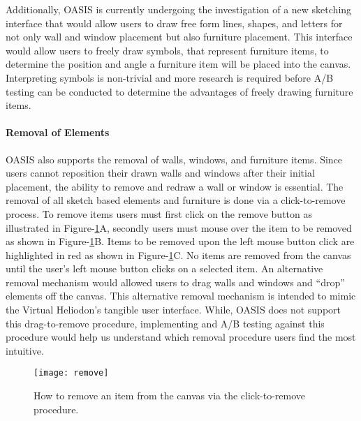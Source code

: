 Additionally, OASIS is currently undergoing the investigation of a new sketching interface that would allow users to draw free form lines, shapes, and letters for not only wall and window placement but also furniture placement.
This interface would allow users to freely draw symbols, that represent furniture items, to determine the position and angle a furniture item will be placed into the canvas.
Interpreting symbols is non-trivial and more research is required before A/B testing can be conducted to determine the advantages of freely drawing furniture items.


\paragraph{Removal of Elements}
OASIS also supports the removal of walls, windows, and furniture items.
Since users cannot reposition their drawn walls and windows after their initial placement, the ability to remove and redraw a wall or window is essential.
The removal of all sketch based elements and furniture is done via a click-to-remove process.
To remove items users must first click on the remove button as illustrated in Figure-\ref{fig:remove}A, secondly users must mouse over the item to be removed as shown in Figure-\ref{fig:remove}B.
Items to be removed upon the left mouse button click are highlighted in red as shown in Figure-\ref{fig:remove}C.
No items are removed from the canvas until the user's left mouse button clicks on a selected item.
An alternative removal mechanism would allowed users to drag walls and windows and ``drop'' elements off the canvas. 
This alternative removal mechanism is intended to mimic the Virtual Heliodon's tangible user interface.
While, OASIS does not support this drag-to-remove procedure,  implementing and A/B testing against this procedure would help us understand which removal procedure users find the most intuitive.

\begin{figure}[!ht]
\centering
\caption{How to remove an item from the canvas via the click-to-remove procedure. 
}
\label{fig:remove}
\texttt{[image: remove]}
\end{figure}

